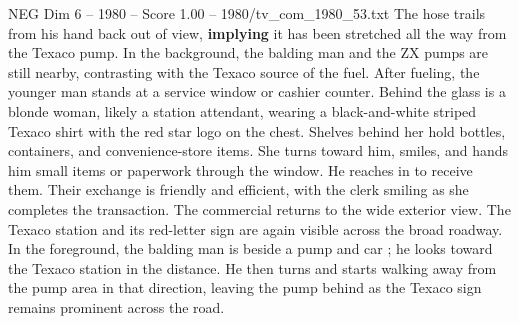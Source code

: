 \begin{textsample}{NEG Dim 6 – 1980 – Score 1.00 – 1980/tv\_com\_1980\_53.txt}
The hose trails from his hand back out of view, \textbf{implying} it has been stretched all the way from the Texaco pump.
In the background, the balding man and the ZX pumps are still nearby, contrasting with the Texaco source of the fuel.
After fueling, the younger man stands at a service window or cashier counter.
Behind the glass is a blonde woman, likely a station attendant, wearing a black-and-white striped Texaco shirt with the red star logo on the chest.
Shelves behind her hold bottles, containers, and convenience-store items.
She turns toward him, smiles, and hands him small items or paperwork through the window.
He reaches in to receive them.
Their exchange is friendly and efficient, with the clerk smiling as she completes the transaction.
The commercial returns to the wide exterior view.
The Texaco station and its red-letter sign are again visible across the broad roadway.
In the foreground, the balding man is beside a pump and car ; he looks toward the Texaco station in the distance.
He then turns and starts walking away from the pump area in that direction, leaving the pump behind as the Texaco sign remains prominent across the road.

\end{textsample}
